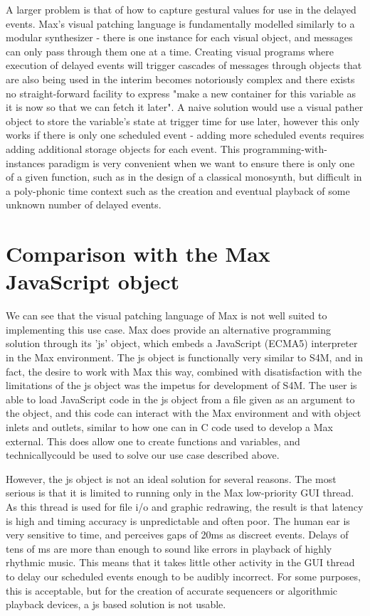 \documentclass[acmsmall]{acmart}
\begin{document}
A larger problem is that of how to capture gestural values for use in the delayed
events. Max's visual patching language is fundamentally modelled similarly to a modular
synthesizer - there is one instance for each visual object, and messages can only
pass through them one at a time. Creating visual programs where execution of 
delayed events will trigger cascades of messages through objects that are also 
being used in the interim becomes notoriously complex and there exists no straight-forward
facility to express "make a new container for this variable as it is now so that
we can fetch it later". A naive solution would use a visual pather object to store 
the variable's state at trigger time for use later, however this only works
if there is only one scheduled event - adding more scheduled events requires adding
additional storage objects for each event. This programming-with-instances paradigm
is very convenient when we want to ensure there is only one of a given function, such
as in the design of a classical monosynth, but difficult in a poly-phonic time context
such as the creation and eventual playback of some unknown number of delayed events.


\section{Comparison with the Max JavaScript object}
We can see that the visual patching language of Max is not well suited to implementing
this use case. Max does provide an alternative programming solution through its
'js' object, which embeds a JavaScript (ECMA5) interpreter in the Max environment.
The js object is functionally very similar to S4M, and in fact, the desire to 
work with Max this way, combined with disatisfaction with the limitations of the js
object was the impetus for development of S4M. The user is able to load JavaScript
code in the js object from a file given as an argument to the object,
and this code can interact with the Max environment and with object inlets and outlets,
similar to how one can in C code used to develop a Max external.
This does allow one to create functions and variables, and technicallycould be used to solve
our use case described above.

However, the js object is not an ideal solution for several reasons. The most serious
is that it is limited to running only in the Max low-priority GUI thread. As this
thread is used for file i/o and graphic redrawing, the result is that latency
is high and timing accuracy is unpredictable and often poor.
The human ear is very sensitive to time, and perceives gaps of 20ms as discreet
events. Delays of tens of ms are more than enough to sound like errors in playback
of highly rhythmic music. This means that it takes little other activity in the
GUI thread to delay our scheduled events enough to be audibly incorrect. 
For some purposes, this is acceptable, but for the creation of accurate 
sequencers or algorithmic playback devices, a js based solution is not usable.
\end{document}
